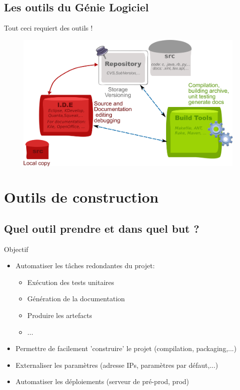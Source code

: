 \documentclass[handout]{beamer}
\begin{document}
\subsection{Les outils du Génie Logiciel}
\begin{frame}
 	\begin{block}{Tout ceci requiert des outils !}
		\begin{figure}[hbtp]
			\includegraphics[scale=0.5]{../img/project-tools.png}
		\end{figure}
 	\end{block}
\end{frame}

\section{Outils de construction}
\subsection{Quel outil prendre et dans quel but ?}
\begin{frame}
 	\begin{block}{Objectif}
		\begin{itemize}
			\item Automatiser les tâches redondantes du projet:
				\begin{itemize}
					\item Exécution des tests unitaires
					\item Génération de la documentation
					\item Produire les artefacts
					\item ...
				\end{itemize}
			\item Permettre de facilement 'construire' le projet (compilation, packaging,...)
			\item Externaliser les paramètres (adresse IPs, paramètres par défaut,...)
			\item Automatiser les déploiements (serveur de pré-prod, prod)	
		\end{itemize}
	\end{block}
\end{frame}
\end{document}
